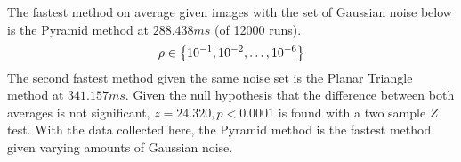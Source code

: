 %
%
%
%
The fastest method on average given images with the set of Gaussian noise below is the Pyramid method at
$288.438\si{ms}$ (of 12000 runs).
\begin{equation}\label{eq:sigmasTested}
    \rho \in \set{10^{-1}, 10^{-2}, \ldots, 10^{-6}}
\end{equation}
The second fastest method given the same noise set is the Planar Triangle method at $341.157\si{ms}$.
Given the null hypothesis that the difference between both averages is not significant, $z = 24.320, p < 0.0001$ is
found with a two sample $Z$ test.
With the data collected here, the Pyramid method is the fastest method given varying amounts of Gaussian noise.

\begin{figure*} %
\end{figure*}

